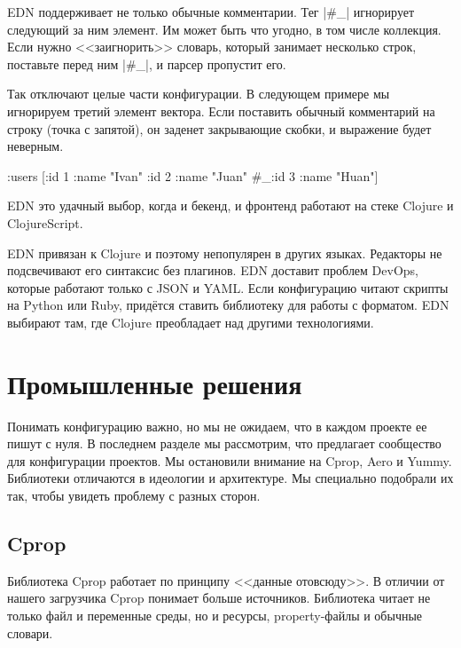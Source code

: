 EDN поддерживает не только обычные комментарии. Тег \spverb|#_| игнорирует
следующий за ним элемент. Им может быть что угодно, в том числе коллекция. Если
нужно <<заигнорить>> словарь, который занимает несколько строк, поставьте перед
ним \spverb|#_|, и парсер пропустит его.

Так отключают целые части конфигурации. В следующем примере мы игнорируем третий
элемент вектора. Если поставить обычный комментарий на строку (точка с запятой),
он заденет закрывающие скобки, и выражение будет неверным.

\begin{english}
  \begin{clojure}
{:users [{:id 1 :name "Ivan"}
         {:id 2 :name "Juan"}
         #_{:id 3 :name "Huan"}]}
  \end{clojure}
\end{english}

EDN это удачный выбор, когда и бекенд, и фронтенд работают на стеке Clojure и
ClojureScript.

EDN привязан к Clojure и поэтому непопулярен в других языках. Редакторы не
подсвечивают его синтаксис без плагинов. EDN доставит проблем DevOps, которые
работают только с JSON и YAML. Если конфигурацию читают скрипты на Python или
Ruby, прид\"{е}тся ставить библиотеку для работы с форматом. EDN выбирают там, где
Clojure преобладает над другими технологиями.

\section{Промышленные решения}

Понимать конфигурацию важно, но мы не ожидаем, что в каждом проекте ее пишут с
нуля. В последнем разделе мы рассмотрим, что предлагает сообщество для
конфигурации проектов. Мы остановили внимание на Cprop, Aero и Yummy. Библиотеки
отличаются в идеологии и архитектуре. Мы специально подобрали их так, чтобы
увидеть проблему с разных сторон.

\subsection{Cprop}

Библиотека Cprop работает по принципу
<<данные отовсюду>>. В отличии от нашего загрузчика Cprop понимает больше
источников. Библиотека читает не только файл и переменные среды, но и ресурсы,
property-файлы и обычные словари.


